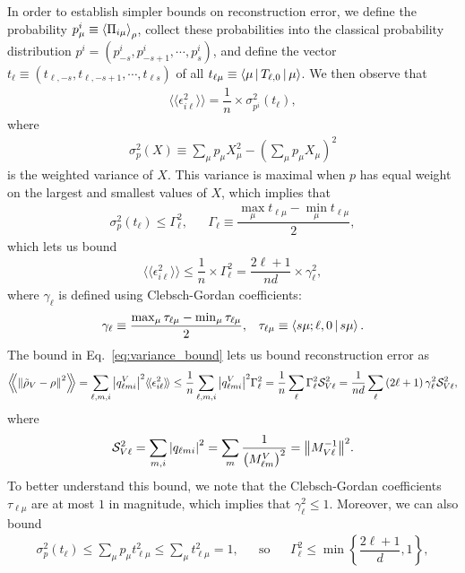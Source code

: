 \documentclass[notitlepage,twocolumn]{revtex4-2}
\renewcommand{\t}{\text} %
\newcommand{\f}[2]{\dfrac{#1}{#2}} %
\newcommand{\p}[1]{\left(#1\right)} %
\newcommand{\bk}{\Braket} %
\renewcommand{\Set}[1]{\left\{#1\right\}} %
\newcommand{\bbk}[1]{\langle\!\langle #1 \rangle\!\rangle}
\newcommand{\Bbk}[1]
{\left\langle\!\!\left\langle #1 \right\rangle\!\!\right\rangle}
\renewcommand{\S}{\mathcal{S}}
\begin{document}
In order to establish simpler bounds on reconstruction error, we define the probability $p^i_\mu\equiv\bk{\Pi_{i\mu}}_\rho$, collect these probabilities into the classical probability distribution $p^i = \p{p^i_{-s}, p^i_{-s+1}, \cdots, p^i_s}$, and define the vector $t_\ell \equiv \p{t_{\ell,-s},t_{\ell,-s+1},\cdots,t_{\ell s}}$ of all $t_{\ell\mu}\equiv\bk{\mu|T_{\ell,0}|\mu}$.
We then observe that
\begin{align}
  \bbk{\epsilon_{i\ell}^2} = \f1n \times \sigma_{p^i}^2\p{t_\ell},
\end{align}
where
\begin{align}
  \sigma_p^2\p{X}
  \equiv \sum_\mu p_\mu X_\mu^2 - \p{\sum_\mu p_\mu X_\mu}^2
\end{align}
is the weighted variance of $X$.
This variance is maximal when $p$ has equal weight on the largest and smallest values of $X$, which implies that
\begin{align}
  \sigma_p^2\p{t_\ell} \le \Gamma_\ell^2,
  &&
  \Gamma_\ell \equiv \f{\max_\mu t_{\ell\mu} - \min_\mu t_{\ell\mu}}{2},
\end{align}
which lets us bound
\begin{align}
  \bbk{\epsilon_{i\ell}^2}
  \le \f1n \times \Gamma_\ell^2
  = \f{2\ell+1}{nd} \times \gamma_\ell^2,
  \label{eq:variance_bound}
\end{align}
where $\gamma_\ell$ is defined using Clebsch-Gordan coefficients:
\begin{align}
  \gamma_\ell \equiv \f{\max_\mu\tau_{\ell\mu} - \min_\mu\tau_{\ell\mu}}{2},
  &&
  \tau_{\ell\mu} \equiv \bk{s\mu;\ell,0|s\mu}.
\end{align}
The bound in Eq.~\eqref{eq:variance_bound} lets us bound reconstruction error as
\begin{align}
  \Bbk{\norm{\tilde\rho_V-\rho}^2}
  = \sum_{\ell,m,i} \abs{q^V_{\ell mi}}^2 \bbk{\epsilon_{i\ell}^2}
  \le \f1n \sum_{\ell,m,i} \abs{q^V_{\ell mi}}^2 \Gamma_\ell^2
  = \f1n \sum_\ell \Gamma_\ell^2 \S_{V\ell}^2
  = \f1{nd} \sum_\ell \p{2\ell+1} \gamma_\ell^2 \S_{V\ell}^2,
\end{align}
where
\begin{align}
  \S_{V\ell}^2 = \sum_{m,i} \abs{q_{\ell mi}}^2
  = \sum_m \f1{\p{M^V_{\ell m}}^2}
  = \norm{M_{V\ell}^{-1}}^2.
\end{align}
To better understand this bound, we note that the Clebsch-Gordan coefficients $\tau_{\ell\mu}$ are at most $1$ in magnitude, which implies that $\gamma_\ell^2\le 1$.
Moreover, we can also bound
\begin{align}
  \sigma_p^2\p{t_\ell} \le \sum_\mu p_\mu t_{\ell\mu}^2
  \le \sum_\mu t_{\ell\mu}^2 = 1,
  &&
  \t{so}
  &&
  \Gamma_\ell^2 \le \min\Set{\f{2\ell+1}{d}, 1},
\end{align}
\end{document}
